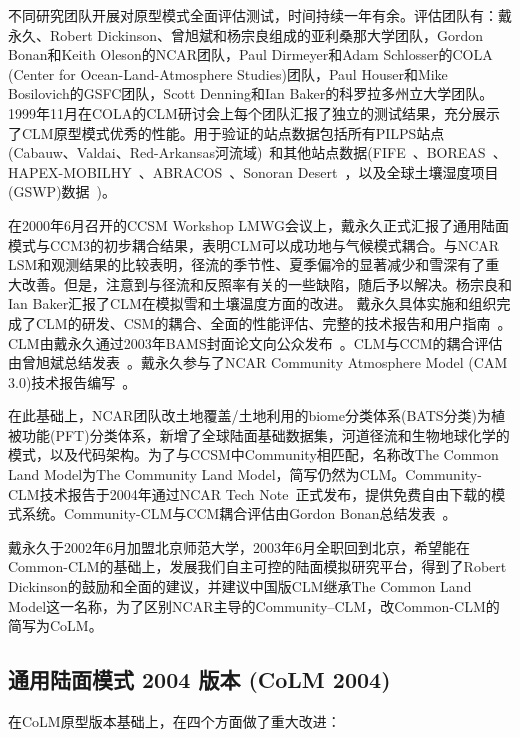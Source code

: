 不同研究团队开展对原型模式全面评估测试，时间持续一年有余。评估团队有：戴永久、Robert Dickinson、曾旭斌和杨宗良组成的亚利桑那大学团队，Gordon Bonan和Keith Oleson的NCAR团队，Paul Dirmeyer和Adam Schlosser的COLA (Center for Ocean-Land-Atmosphere Studies)团队，Paul Houser和Mike Bosilovich的GSFC团队，Scott Denning和Ian Baker的科罗拉多州立大学团队。1999年11月在COLA的CLM研讨会上每个团队汇报了独立的测试结果，充分展示了CLM原型模式优秀的性能。用于验证的站点数据包括所有PILPS站点(Cabauw、Valdai、Red-Arkansas河流域)~\citep{Henderson-Sellers_1993_PILPS}和其他站点数据(FIFE~\citep{Sellers88FIFE}、BOREAS~\citep{Sellers95BOREAS}、HAPEX-MOBILHY~\citep{Andre1986hapex}、ABRACOS~\citep{Gash96ABRACOS}、Sonoran Desert~\citep{Unland1996surface}，以及全球土壤湿度项目(GSWP)数据~\citep{Dirmeyer1999global})。

在2000年6月召开的CCSM Workshop LMWG会议上，戴永久正式汇报了通用陆面模式与CCM3的初步耦合结果，表明CLM可以成功地与气候模式耦合。与NCAR LSM和观测结果的比较表明，径流的季节性、夏季偏冷的显著减少和雪深有了重大改善。但是，注意到与径流和反照率有关的一些缺陷，随后予以解决。杨宗良和Ian Baker汇报了CLM在模拟雪和土壤温度方面的改进。
戴永久具体实施和组织完成了CLM的研发、CSM的耦合、全面的性能评估、完整的技术报告和用户指南~\citep{Dai2001CoLM}。CLM由戴永久通过2003年BAMS封面论文向公众发布~\citep{dai2003common}。CLM与CCM的耦合评估由曾旭斌总结发表~\citep{zeng2002coupling}。戴永久参与了NCAR Community Atmosphere Model (CAM 3.0)技术报告编写~\citep{Collins2004CAM}。

在此基础上，NCAR团队改土地覆盖/土地利用的biome分类体系(BATS分类)为植被功能(PFT)分类体系，新增了全球陆面基础数据集，河道径流和生物地球化学的模式，以及代码架构。为了与CCSM中Community相匹配，名称改The Common Land Model为The Community Land Model，简写仍然为CLM。Community-CLM技术报告于2004年通过NCAR Tech Note~\citep{Oleson2004CLM}正式发布，提供免费自由下载的模式系统。Community-CLM与CCM耦合评估由Gordon Bonan总结发表~\citep{Bonan2002CLM}。

戴永久于2002年6月加盟北京师范大学，2003年6月全职回到北京，希望能在Common-CLM的基础上，发展我们自主可控的陆面模拟研究平台，得到了Robert Dickinson的鼓励和全面的建议，并建议中国版CLM继承The Common Land Model这一名称，为了区别NCAR主导的Community–CLM，改Common-CLM的简写为CoLM。


\subsection{通用陆面模式 2004 版本 (CoLM 2004)}
在CoLM原型版本基础上，在四个方面做了重大改进：

